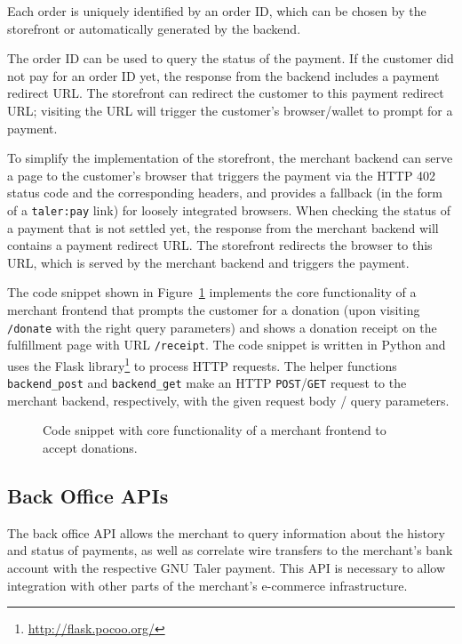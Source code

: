 Each order is uniquely identified by an order ID, which can be chosen by the
storefront or automatically generated by the backend.

The order ID can be used to query the status of the payment.  If the customer
did not pay for an order ID yet, the response from the backend includes a
payment redirect URL.  The storefront can redirect the customer to this
payment redirect URL; visiting the URL will trigger the customer's
browser/wallet to prompt for a payment.

To simplify the implementation of the storefront, the merchant backend can
serve a page to the customer's browser that triggers the payment via the HTTP
402 status code and the corresponding headers, and provides a fallback (in the
form of a \texttt{taler:pay} link) for loosely integrated browsers.
When checking the status of a payment that is not settled yet, the response from the merchant backend
will contains a payment redirect URL.  The storefront redirects the browser to this URL,
which is served by the merchant backend and triggers the payment.

The code snippet shown in Figure~\ref{fig:merchant-donations-code} implements
the core functionality of a merchant frontend that prompts the customer for a
donation (upon visiting \texttt{/donate} with the right query parameters) and
shows a donation receipt on the fulfillment page with URL \texttt{/receipt}.
The code snippet is written in Python and uses the Flask library\footnote{\url{http://flask.pocoo.org/}} to process HTTP requests.
The helper functions \texttt{backend\_post}
and \texttt{backend\_get} make an HTTP \texttt{POST}/\texttt{GET} request to the merchant backend, respectively,
with the given request body / query parameters.

\begin{figure}

\caption[Code snippet for merchant frontend]{Code snippet with core functionality of a merchant frontend to accept donations.}
\label{fig:merchant-donations-code}
\end{figure}


\subsection{Back Office APIs}
The back office API allows the merchant to query information about the history
and status of payments, as well as correlate wire transfers to the merchant's
bank account with the respective GNU Taler payment.  This API is necessary to
allow integration with other parts of the merchant's e-commerce infrastructure.

